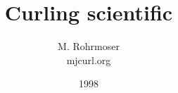 \documentclass[a4paper,11pt,twoside]{report}
\title{Curling scientific}
\author{M. Rohrmoser\\{\small m\symbol{64}jcurl.org}}
\begin{document}
\date{1998}
\maketitle
\tableofcontents
\listoffigures


\begin{appendix}
\end{appendix}


 \nocite{brach:92}
 \nocite{feynmanI:89}
 \nocite{gammert}
 \nocite{greinerII:85}
 \nocite{gross:95}
 \nocite{hertz:81}
 \nocite{hills:93}
 \nocite{hughesI:76}
 \nocite{hughesII:76}
 \nocite{lehmann:85}
 \nocite{meybergI:93}
 \nocite{van:89}
 \nocite{sutor:88}
 \nocite{denny:98}
 \nocite{shegelski:96}
 \nocite{voyenli:85}
 \nocite{voyenli:86}
 \nocite{daniels:86}
 \nocite{johnston:81}
\end{document}
